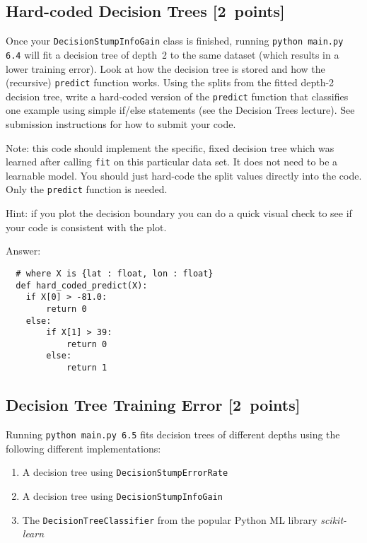 \documentclass{article}
\newcommand{\blu}[1]{{\textcolor{blu}{#1}}}
\newenvironment{answer}{\par\begingroup\color{gre}Answer: }{\endgroup}
\let\ask\blu
\newcommand\pts[1]{\textcolor{pointscolour}{[#1~points]}}
\begin{document}
  \subsection{Hard-coded Decision Trees \pts{2}}

  Once your \texttt{DecisionStumpInfoGain} class is finished, running \texttt{python main.py 6.4} will fit
  a decision tree of depth~2 to the same dataset (which results in a lower training error).
  Look at how the decision tree is stored and how the (recursive) \texttt{predict} function works.
  \ask{Using the splits from the fitted depth-2 decision tree, write a hard-coded version of the \texttt{predict}
  function that classifies one example using simple if/else statements
  (see the Decision Trees lecture). See submission instructions for how to submit your code.}

  Note: this code should implement the specific, fixed decision tree
  which was learned after calling \texttt{fit} on this particular data set. It does not need to be a learnable model.
  You should just hard-code the split values directly into the code.
  Only the \texttt{predict} function is needed.

  Hint: if you plot the decision boundary you can do a quick visual check to see if your code is consistent with the plot.

  \begin{answer}
  \begin{verbatim}
  # where X is {lat : float, lon : float}
  def hard_coded_predict(X):
    if X[0] > -81.0:
        return 0
    else:
        if X[1] > 39:
            return 0
        else:
            return 1
  \end{verbatim}
  \end{answer}

  \subsection{Decision Tree Training Error \pts{2}}

  Running \texttt{python main.py 6.5} fits decision trees of different depths using the following different implementations:
  \begin{enumerate}
  \item A decision tree using \texttt{DecisionStumpErrorRate}
  \item A decision tree using \texttt{DecisionStumpInfoGain}
  \item The \texttt{DecisionTreeClassifier} from the popular Python ML library \emph{scikit-learn}
  \end{enumerate}
\end{document}
